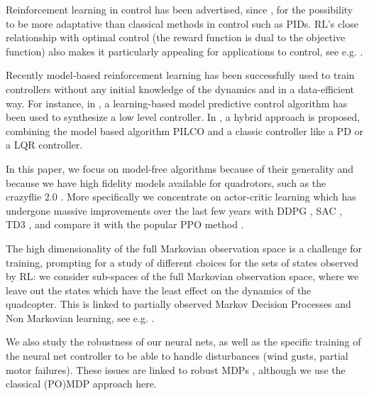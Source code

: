 \documentclass[anonymous=true,format=sigconf, screen=true, review=false]{acmart}
\begin{document}
Reinforcement learning in control has been advertised, since 
\cite{Sutton}, for the possibility to be more adaptative than classical methods in control such as PIDs. RL's close relationship with optimal control (the reward function is dual to the objective function) also makes it particularly appealing for applications to control, see e.g. \cite{bertsekas2019reinforcement}. 

Recently model-based reinforcement learning has been successfully used to train controllers without any initial knowledge of the dynamics and in a data-efficient way. For instance, in \cite{lambert2019low}, a learning-based model predictive control algorithm has been used to synthesize a low level controller. In \cite{yoo2020hybrid}, a hybrid approach is proposed, combining the model based algorithm PILCO \cite{Deisenroth2011PILCOAM} and a classic controller like a PD or a LQR controller. %



In this paper, we focus on model-free algorithms because of their generality and because we have high fidelity models available for quadrotors, such as the crazyflie 2.0 \cite{nanoquadcop}. More specifically we concentrate on actor-critic learning which has undergone massive improvements over the last few years with DDPG \cite{DDPG}, SAC \cite{SAC}, TD3 \cite{TD3}, and compare it with the popular PPO method \cite{PPO}.

The high dimensionality of the full Markovian observation space is a challenge for training, prompting for a study of different choices for the sets of states observed by RL: we consider sub-spaces of the full Markovian observation space, where we leave out the states which have the least effect on the dynamics of the quadcopter. This is linked to partially observed Markov Decision Processes and Non Markovian learning, see e.g. \cite{NMR}. 

We also study the robustness of our neural nets, as well as the specific training of the neural net controller to be able to handle disturbances (wind gusts, partial motor failures). These issues are linked to robust MDPs \cite{RMDP}, although we use the classical (PO)MDP approach here. 
\end{document}
